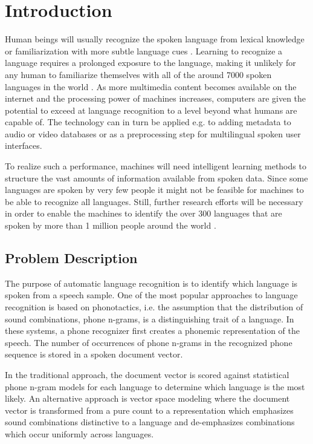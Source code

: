 \chapter{Introduction}

Human beings will usually recognize the spoken language from lexical knowledge or familiarization with more subtle language cues \cite[p. 785]{lidbok}. Learning to recognize a language requires a prolonged exposure to the language, making it unlikely for any human to familiarize themselves with all of the around 7000 spoken languages in the world \cite[p. 798]{lidbok}. As more multimedia content becomes available on the internet and the processing power of machines increases, computers are given the potential to exceed at language recognition to a level beyond what humans are capable of. The technology can in turn be applied e.g. to adding metadata to audio or video databases or as a preprocessing step for multilingual spoken user interfaces. 

To realize such a performance, machines will need intelligent learning methods to structure the vast amounts of information available from spoken data. Since some languages are spoken by very few people it might not be feasible for machines to be able to recognize all languages. Still, further research efforts will be necessary  in order to enable the machines to identify the over 300 languages that are spoken by more than 1 million people around the world \cite[p. 797]{lidbok}.



\section{Problem Description}

The purpose of automatic language recognition is to identify which language is spoken from a speech sample. One of the most popular approaches to language recognition is based on phonotactics, i.e. the assumption that the distribution of sound combinations, phone n-grams, is a distinguishing trait of a language. In these systems, a phone recognizer first creates a phonemic representation of the speech. The number of occurrences of phone n-grams in the recognized phone sequence is stored in a spoken document vector. 

In the traditional approach, the document vector is scored against statistical phone n-gram models for each language to determine which language is the most likely. An alternative approach is vector space modeling where the document vector is transformed from a pure count to a representation which emphasizes sound combinations distinctive to a language and de-emphasizes combinations which occur uniformly across languages. 

